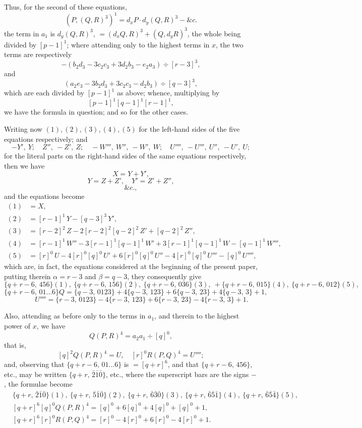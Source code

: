 \documentclass[11pt,a4paper]{article}
\begin{document}
Thus, for the second of these equations,
\[
(P, (Q, R)^{3})^{1} = d_{x}P\cdot d_{y}(Q, R)^{3} - \&c.
\]
the term in $a_{1}$ is $d_{y}(Q, R)^{3}$, $= (d_{x}Q, R)^{3} + (Q, d_{y}R)^{3}$, the whole being divided by $[p-1]^{1}$; where attending only to the highest terms in $x$, the two terms are respectively
\[
-(b_{2}d_{3} - 3c_{2}c_{3} + 3d_{2}b_{3} - e_{2}a_{3}) \div [r-3]^{3},
\]
and
\[
(a_{2}e_{3} - 3b_{2}d_{3} + 3c_{2}c_{3} - d_{2}b_{3}) \div [q-3]^{3},
\]
which are each divided by $[p-1]^{1}$ as above; whence, multiplying by
\[
[p-1]^{1}[q-1]^{1}[r-1]^{1},
\]
we have the formula in question; and so for the other cases.

\medskip

Writing now $(1), (2), (3), (4), (5)$ for the left-hand sides of the five equations respectively; and
\[
-Y',\ Y;\quad Z'',\ -Z',\ Z;\quad -W''',\ W'',\ -W',\ W;\quad U'''',\ -U''',\ U'',\ -U',\ U;
\]
for the literal parts on the right-hand sides of the same equations respectively, then we have
\[
X = Y + Y',
\]
\[
Y = Z + Z',\quad Y' = Z' + Z'',
\]
\[
\&c.,
\]
and the equations become
\begin{align*}
(1) &= X,\\
(2) &= [r-1]^{1}\,Y - [q-3]^{3}\,Y',\\
(3) &= [r-2]^{2}\,Z - 2[r-2]^{2}[q-2]^{2}\,Z' + [q-2]^{2}\,Z'',\\
(4) &= [r-1]^{1}\,W'' - 3[r-1]^{1}[q-1]^{1}\,W' + 3[r-1]^{1}[q-1]^{1}\,W - [q-1]^{1}\,W''',\\
(5) &= [r]^{0}\,U - 4[r]^{0}[q]^{0}\,U' + 6[r]^{0}[q]^{0}\,U'' - 4[r]^{0}[q]^{0}\,U''' - [q]^{0}\,U'''',
\end{align*}
which are, in fact, the equations considered at the beginning of the present paper, putting therein $\alpha = r - 3$ and $\beta = q - 3$, they consequently give
\[
\{q+r-6,\,456\}(1),\ \{q+r-6,\,156\}(2),\ \{q+r-6,\,036\}(3),\ +\{q+r-6,\,015\}(4),\ \{q+r-6,\,012\}(5),
\]
\[
\{q+r-6,\,01\ldots 6\}Q = \{q-3,\,0123\} + 4\{q-3,\,123\} + 6\{q-3,\,23\} + 4\{q-3,\,3\} + 1,
\]
\[
\quad\quad\quad U'''' = \{r-3,\,0123\} - 4\{r-3,\,123\} + 6\{r-3,\,23\} - 4\{r-3,\,3\} + 1.
\]

\newpage


Also, attending as before only to the terms in $a_{1}$, and therein to the highest power of $x$, we have
\[
Q(P, R)^{4} = a_{2}a_{1}\div [q]^{0},
\]
that is,
\[
[q]^{2}Q(P, R)^{4} = U,\quad [r]^{0}R(P, Q)^{4} = U'''';
\]
and, observing that $\{q + r - 6,\,01\ldots 6\}$ is $= [q + r]^{6}$, and that $\{q + r - 6,\,456\}$, etc., may be written $\{q+r,\,\bar{2}\bar{1}\bar{0}\}$, etc., where the superscript bars are the signs $-$, the formulae become
\begin{align*}
&\{q+r,\,\bar{2}\bar{1}\bar{0}\}(1),\ \{q+r,\,\bar{5}\bar{1}\bar{0}\}(2),\ \{q+r,\,\bar{6}\bar{3}\bar{0}\}(3),\ \{q+r,\,\bar{6}\bar{5}\bar{1}\}(4),\ \{q+r,\,\bar{6}\bar{5}\bar{4}\}(5),\\
&[q+r]^{6}[q]^{0}Q(P, R)^{4} = [q]^{0} + 6[q]^{0} + 4[q]^{0} + [q]^{0} + 1,\\
&[q+r]^{6}[r]^{0}R(P, Q)^{4} = [r]^{0} - 4[r]^{0} + 6[r]^{0} - 4[r]^{0} + 1.
\end{align*}
\end{document}

